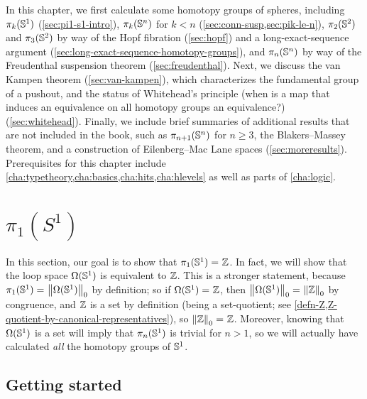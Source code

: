 In this chapter, we first calculate some homotopy groups of spheres,
including $\pi_k(\Sn ^1)$ (\autoref{sec:pi1-s1-intro}), $\pi_{k}(\Sn
^n)$ for $k<n$ (\autoref{sec:conn-susp,sec:pik-le-n}), $\pi_2(\Sn ^2)$ and $\pi_3(\Sn ^2)$ by
way of the Hopf fibration (\autoref{sec:hopf}) and a long-exact-sequence
argument (\autoref{sec:long-exact-sequence-homotopy-groups}), and
$\pi_n(\Sn ^n)$ by way of the Freudenthal suspension theorem
(\autoref{sec:freudenthal}).  Next, we discuss the van Kampen theorem
(\autoref{sec:van-kampen}), which characterizes the fundamental group of
a pushout, and the status of Whitehead's principle (when is a map that
induces an equivalence on all homotopy groups an equivalence?)
(\autoref{sec:whitehead}).  Finally, we include brief summaries of
additional results that are not included in the book, such as
$\pi_{n+1}(\Sn ^n)$ for $n\ge 3$, the Blakers--Massey theorem, and a
construction of Eilenberg--Mac Lane spaces (\autoref{sec:moreresults}).
Prerequisites for this chapter include \autoref{cha:typetheory,cha:basics,cha:hits,cha:hlevels} as well as parts of \autoref{cha:logic}.

\section{\texorpdfstring{$\pi_1(S^1)$}{π₁(S¹)}}
\label{sec:pi1-s1-intro}

In this section, our goal is to show that $\id {\pi_1(\Sn ^1)} {\Z}$.
In fact, we will show that the loop space ${\Omega(\Sn ^1)}$ is equivalent to $\Z$.
This is a stronger statement, because $\id{\pi_1(\Sn ^1)} {\trunc 0 {\Omega(\Sn ^1)}}$ by
definition; so if $\id {\Omega(\Sn ^1)} {\Z}$, then $\id {\trunc
  0 {\Omega(\Sn ^1)}} {\trunc 0 {\Z}}$ by congruence, and
$\Z$ is a set by definition (being a set-quotient; see \autoref{defn-Z,Z-quotient-by-canonical-representatives}), so $\id {\trunc 0 {\Z}} {\Z}$.
Moreover, knowing that ${\Omega(\Sn ^1)}$ is a set will imply that $\pi_n(\Sn^1)$ is trivial for $n>1$, so we will actually have calculated \emph{all} the homotopy groups of $\Sn^1$.

\subsection{Getting started}
\label{sec:pi1s1-initial-thoughts}

